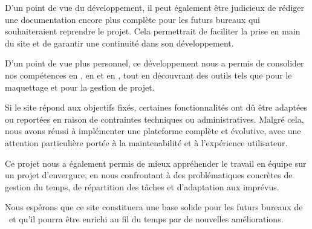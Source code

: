 D'un point de vue du développement, il peut également être judicieux de rédiger une documentation encore plus complète pour les futurs bureaux qui souhaiteraient reprendre le projet. Cela permettrait de faciliter la prise en main du site et de garantir une continuité dans son développement.
\bigskip

D'un point de vue plus personnel, ce développement nous a permis de consolider nos compétences en , en  et en , tout en découvrant des outils tels que  pour le maquettage et  pour la gestion de projet.
\bigskip

Si le site répond aux objectifs fixés, certaines fonctionnalités ont dû être adaptées ou reportées en raison de contraintes techniques ou administratives. Malgré cela, nous avons réussi à implémenter une plateforme complète et évolutive, avec une attention particulière portée à la maintenabilité et à l’expérience utilisateur.

Ce projet nous a également permis de mieux appréhender le travail en équipe sur un projet d’envergure, en nous confrontant à des problématiques concrètes de gestion du temps, de répartition des tâches et d’adaptation aux imprévus.
\bigskip

Nous espérons que ce site constituera une base solide pour les futurs bureaux de \ofni\ et qu’il pourra être enrichi au fil du temps par de nouvelles améliorations.
